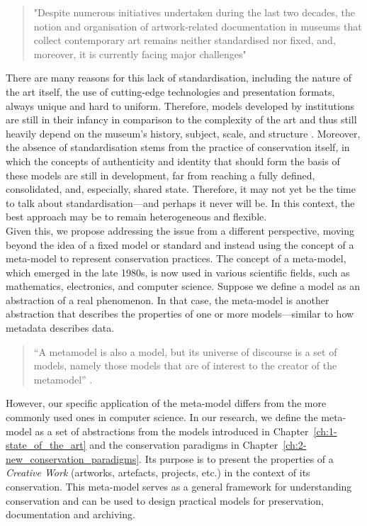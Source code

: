\begin{quote}
    "Despite numerous initiatives undertaken during the last two decades, the notion and organisation of artwork-related documentation in museums that collect contemporary art remains neither standardised nor fixed, and, moreover, it is currently facing major challenges" \cite{wielocha2024collections}
\end{quote}
There are many reasons for this lack of standardisation, including the nature of the art itself, the use of cutting-edge technologies and presentation formats, always unique and hard to uniform. Therefore, models developed by institutions are still in their infancy in comparison to the complexity of the art and thus still heavily depend on the museum’s history, subject, scale, and structure \cite{wielocha2024collections}. Moreover, the absence of standardisation stems from the practice of conservation itself, in which the concepts of authenticity and identity that should form the basis of these models are still in development, far from reaching a fully defined, consolidated, and, especially, shared state. Therefore, it may not yet be the time to talk about standardisation—and perhaps it never will be. In this context, the best approach may be to remain heterogeneous and flexible.\\
Given this, we propose addressing the issue from a different perspective, moving beyond the idea of a fixed model or standard and instead using the concept of a meta-model to represent conservation practices. The concept of a meta-model, which emerged in the late 1980s, is now used in various scientific fields, such as mathematics, electronics, and computer science. Suppose we define a model as an abstraction of a real phenomenon. In that case, the meta-model is another abstraction that describes the properties of one or more models—similar to how metadata describes data.
\begin{quote}
“A metamodel is also a model, but its universe of discourse is a set of models, namely those models that are of interest to the creator of the metamodel” \cite{Liu2009-od}.    
\end{quote}
However, our specific application of the meta-model differs from the more commonly used ones in computer science. In our research, we define the meta-model as a set of abstractions from the models introduced in Chapter~\ref{ch:1-state_of_the_art} and the conservation paradigms in Chapter~\ref{ch:2-new_conservation_paradigms}. Its purpose is to present the properties of a \textit{Creative Work} (artworks, artefacts, projects, etc.) in the context of its conservation. This meta-model serves as a general framework for understanding conservation and can be used to design practical models for preservation, documentation and archiving.\\
